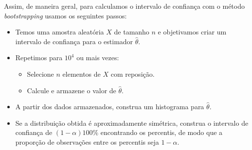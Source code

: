 \documentclass{article}
\begin{document}
Assim, de maneira geral, para calculamos o intervalo de confiança com o método \textit{bootstrapping} usamos os seguintes passos:
\begin{itemize}
    \item Temos uma amostra aleatória $X$ de tamanho $n$ e objetivamos criar um intervalo de confiança para o estimador $\hat{\theta}$.
    \item Repetimos para $10^4$ ou mais vezes:
    \begin{itemize}
        \item Selecione $n$ elementos de $X$ com reposição.
        \item Calcule e armazene o valor de $\hat{\theta}$.
    \end{itemize}
    \item A partir dos dados armazenados, construa um histograma para $\hat{\theta}$.
    \item Se a distribuição obtida é aproximadamente simétrica, construa o intervalo de confiança de $(1-\alpha)100\%$ encontrando os percentis, de modo que a proporção de observações entre os percentis seja $1-\alpha$.
\end{itemize}

\end{document}
